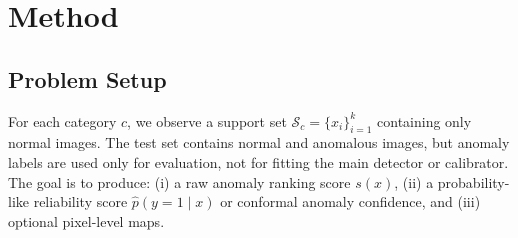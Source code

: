 \section{Method}\label{sec:method}
\subsection{Problem Setup}
For each category $c$, we observe a support set $\mathcal{S}_c=\{x_i\}_{i=1}^{k}$ containing only normal images. The test set contains normal and anomalous images, but anomaly labels are used only for evaluation, not for fitting the main detector or calibrator. The goal is to produce: (i) a raw anomaly ranking score $s(x)$, (ii) a probability-like reliability score $\hat{p}(y=1\mid x)$ or conformal anomaly confidence, and (iii) optional pixel-level maps.

